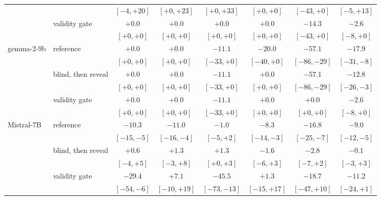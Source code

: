 \begin{tabular}{llcccccc}
 & & {\scriptsize$[-4,+20]$} & {\scriptsize$[+0,+23]$} & {\scriptsize$[+0,+33]$} & {\scriptsize$[+0,+0]$} & {\scriptsize$[-43,+0]$} & {\scriptsize$[-5,+13]$} \\
 & validity gate & $+0.0$ & $+0.0$ & $+0.0$ & $+0.0$ & $-14.3$ & $-2.6$ \\
 & & {\scriptsize$[+0,+0]$} & {\scriptsize$[+0,+0]$} & {\scriptsize$[+0,+0]$} & {\scriptsize$[+0,+0]$} & {\scriptsize$[-43,+0]$} & {\scriptsize$[-8,+0]$} \\
\addlinespace
gemma-2-9b & reference & $+0.0$ & $+0.0$ & $-11.1$ & $-20.0$ & $-57.1$ & $-17.9$ \\
 & & {\scriptsize$[+0,+0]$} & {\scriptsize$[+0,+0]$} & {\scriptsize$[-33,+0]$} & {\scriptsize$[-40,+0]$} & {\scriptsize$[-86,-29]$} & {\scriptsize$[-31,-8]$} \\
 & blind, then reveal & $+0.0$ & $+0.0$ & $-11.1$ & $+0.0$ & $-57.1$ & $-12.8$ \\
 & & {\scriptsize$[+0,+0]$} & {\scriptsize$[+0,+0]$} & {\scriptsize$[-33,+0]$} & {\scriptsize$[+0,+0]$} & {\scriptsize$[-86,-29]$} & {\scriptsize$[-26,-3]$} \\
 & validity gate & $+0.0$ & $+0.0$ & $-11.1$ & $+0.0$ & $+0.0$ & $-2.6$ \\
 & & {\scriptsize$[+0,+0]$} & {\scriptsize$[+0,+0]$} & {\scriptsize$[-33,+0]$} & {\scriptsize$[+0,+0]$} & {\scriptsize$[+0,+0]$} & {\scriptsize$[-8,+0]$} \\
\addlinespace
Mistral-7B & reference & $-10.3$ & $-11.0$ & $-1.0$ & $-8.3$ & $-16.8$ & $-9.0$ \\
 & & {\scriptsize$[-15,-5]$} & {\scriptsize$[-16,-4]$} & {\scriptsize$[-5,+2]$} & {\scriptsize$[-14,-3]$} & {\scriptsize$[-25,-7]$} & {\scriptsize$[-12,-5]$} \\
 & blind, then reveal & $+0.6$ & $+1.3$ & $+1.3$ & $-1.6$ & $-2.8$ & $-0.1$ \\
 & & {\scriptsize$[-4,+5]$} & {\scriptsize$[-3,+8]$} & {\scriptsize$[+0,+3]$} & {\scriptsize$[-6,+3]$} & {\scriptsize$[-7,+2]$} & {\scriptsize$[-3,+3]$} \\
 & validity gate & $-29.4$ & $+7.1$ & $-45.5$ & $+1.3$ & $-18.7$ & $-11.2$ \\
 & & {\scriptsize$[-54,-6]$} & {\scriptsize$[-10,+19]$} & {\scriptsize$[-73,-13]$} & {\scriptsize$[-15,+17]$} & {\scriptsize$[-47,+10]$} & {\scriptsize$[-24,+1]$} \\
\bottomrule
\end{tabular}
